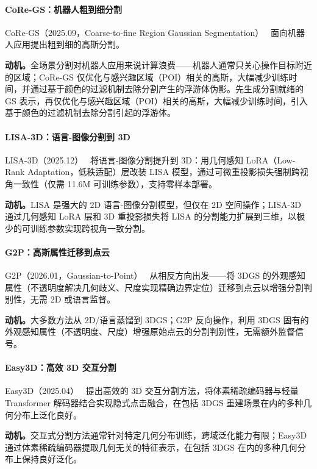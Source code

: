 \paragraph{CoRe-GS：机器人粗到细分割} CoRe-GS（2025.09，Coarse-to-fine Region Gaussian Segmentation）~\cite{2509_04859} 面向机器人应用提出粗到细的高斯分割。

\textbf{动机。}全场景分割对机器人应用来说计算浪费——机器人通常只关心操作目标附近的区域；CoRe-GS 仅优化与感兴趣区域（POI）相关的高斯，大幅减少训练时间，并通过基于颜色的过滤机制去除分割产生的浮游体伪影。先生成分割就绪的 GS 表示，再仅优化与感兴趣区域（POI）相关的高斯，大幅减少训练时间，引入基于颜色的过滤机制去除分割引起的浮游体。

\paragraph{LISA-3D：语言-图像分割到 3D} LISA-3D（2025.12）~\cite{2512_01008} 将语言-图像分割提升到 3D：用几何感知 LoRA（Low-Rank Adaptation，低秩适配）层改装 LISA 模型，通过可微重投影损失强制跨视角一致性（仅需 11.6M 可训练参数），支持零样本部署。

\textbf{动机。}LISA 是强大的 2D 语言-图像分割模型，但仅在 2D 空间操作；LISA-3D 通过几何感知 LoRA 层和 3D 重投影损失将 LISA 的分割能力扩展到三维，以极少的可训练参数实现跨视角一致分割。

\paragraph{G2P：高斯属性迁移到点云} G2P（2026.01，Gaussian-to-Point）~\cite{2601_03510} 从相反方向出发——将 3DGS 的外观感知属性（不透明度解决几何歧义、尺度实现精确边界定位）迁移到点云以增强分割判别性，无需 2D 或语言监督。

\textbf{动机。}大多数方法从 2D/语言蒸馏到 3DGS；G2P 反向操作，利用 3DGS 固有的外观感知属性（不透明度、尺度）增强原始点云的分割判别性，无需额外监督信号。

\paragraph{Easy3D：高效 3D 交互分割} Easy3D（2025.04）~\cite{2504_11024} 提出高效的 3D 交互分割方法，将体素稀疏编码器与轻量 Transformer 解码器结合实现隐式点击融合，在包括 3DGS 重建场景在内的多种几何分布上泛化良好。

\textbf{动机。}交互式分割方法通常针对特定几何分布训练，跨域泛化能力有限；Easy3D 通过体素稀疏编码器提取几何无关的特征表示，在包括 3DGS 在内的多种几何分布上保持良好泛化。

